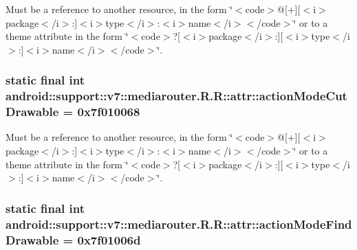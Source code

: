 Must be a reference to another resource, in the form \char`\"{}$<$code$>$@\mbox{[}+\mbox{]}\mbox{[}$<$i$>$package$<$/i$>$:\mbox{]}$<$i$>$type$<$/i$>$:$<$i$>$name$<$/i$>$$<$/code$>$\char`\"{} or to a theme attribute in the form \char`\"{}$<$code$>$?\mbox{[}$<$i$>$package$<$/i$>$:\mbox{]}\mbox{[}$<$i$>$type$<$/i$>$:\mbox{]}$<$i$>$name$<$/i$>$$<$/code$>$\char`\"{}. \hypertarget{classandroid_1_1support_1_1v7_1_1mediarouter_1_1_r_1_1attr_c41d39e35409c317fa4e6ef3642ad6cf}{
\subsubsection[{actionModeCutDrawable}]{\setlength{\rightskip}{0pt plus 5cm}static final int android::support::v7::mediarouter.R.R::attr::actionModeCutDrawable = 0x7f010068}}
\label{classandroid_1_1support_1_1v7_1_1mediarouter_1_1_r_1_1attr_c41d39e35409c317fa4e6ef3642ad6cf}


Must be a reference to another resource, in the form \char`\"{}$<$code$>$@\mbox{[}+\mbox{]}\mbox{[}$<$i$>$package$<$/i$>$:\mbox{]}$<$i$>$type$<$/i$>$:$<$i$>$name$<$/i$>$$<$/code$>$\char`\"{} or to a theme attribute in the form \char`\"{}$<$code$>$?\mbox{[}$<$i$>$package$<$/i$>$:\mbox{]}\mbox{[}$<$i$>$type$<$/i$>$:\mbox{]}$<$i$>$name$<$/i$>$$<$/code$>$\char`\"{}. \hypertarget{classandroid_1_1support_1_1v7_1_1mediarouter_1_1_r_1_1attr_f95dd107ba58631253c4aebd7bbe5bd0}{
\subsubsection[{actionModeFindDrawable}]{\setlength{\rightskip}{0pt plus 5cm}static final int android::support::v7::mediarouter.R.R::attr::actionModeFindDrawable = 0x7f01006d}}
\label{classandroid_1_1support_1_1v7_1_1mediarouter_1_1_r_1_1attr_f95dd107ba58631253c4aebd7bbe5bd0}


